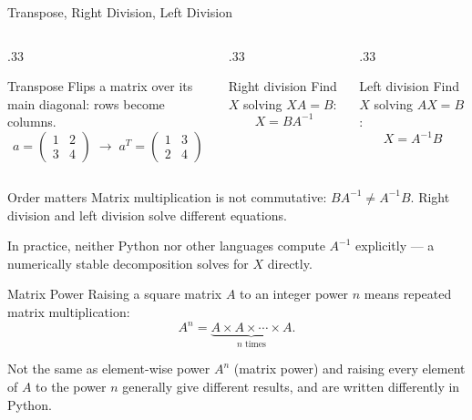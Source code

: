 \documentclass[9pt,aspectratio=169,xcolor=table]{beamer}
\begin{document}
\begin{frame}{Transpose, Right Division, Left Division}
    \leavevmode
    \small
    \begin{columns}[t]
        \begin{column}{.33\textwidth}
            \begin{block}{Transpose}
                \scriptsize Flips a matrix over its main diagonal: rows
                become columns.
                \[
                a = \begin{pmatrix} 1 & 2 \\ 3 & 4 \end{pmatrix}
                \;\to\;
                a^T = \begin{pmatrix} 1 & 3 \\ 2 & 4 \end{pmatrix}
                \]
            \end{block}
        \end{column}
        \begin{column}{.33\textwidth}
            \begin{block}{Right division}
                \scriptsize Find $X$ solving $XA = B$:
                \[ X = BA^{-1} \]
            \end{block}
        \end{column}
        \begin{column}{.33\textwidth}
            \begin{block}{Left division}
                \scriptsize Find $X$ solving $AX = B$:
                \[ X = A^{-1}B \]
            \end{block}
        \end{column}
    \end{columns}

    \vspace{3mm}
    \begin{alertblock}{Order matters}
        Matrix multiplication is \alert{not} commutative:
        $BA^{-1} \neq A^{-1}B$. Right division and left division solve
        different equations.
    \end{alertblock}

    \vspace{2mm}
    {\scriptsize In practice, neither Python nor other languages compute
    $A^{-1}$ explicitly --- a numerically stable decomposition solves
    for $X$ directly.}
\end{frame}

\begin{frame}{Matrix Power}
    \leavevmode
    Raising a square matrix $A$ to an integer power $n$ means repeated
    \alert{matrix} multiplication:
    \[
    A^n = \underbrace{A \times A \times \cdots \times A}_{n \text{ times}}.
    \]

    \vspace{3mm}
    \begin{alertblock}{Not the same as element-wise power}
        $A^n$ (matrix power) and raising every \alert{element} of $A$
        to the power $n$ generally give different results, and are
        written differently in Python.
    \end{alertblock}
\end{frame}
\end{document}
